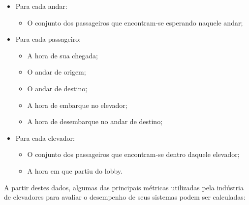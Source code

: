 \begin{itemize}
  \item Para cada andar:
  \begin{itemize}
    \item O conjunto dos passageiros que encontram-se esperando naquele andar;
  \end{itemize}
  \item Para cada passageiro:
  \begin{itemize}
    \item A hora de sua chegada;
    \item O andar de origem;
    \item O andar de destino;
    \item A hora de embarque no elevador;
    \item A hora de desembarque no andar de destino;
  \end{itemize}
  \item Para cada elevador:
  \begin{itemize}
    \item O conjunto dos passageiros que encontram-se dentro daquele elevador;
    \item A hora em que partiu do lobby.
  \end{itemize}
\end{itemize}

A partir destes dados, algumas das principais métricas utilizadas pela indústria
de elevadores para avaliar o desempenho de seus sistemas podem ser calculadas:

